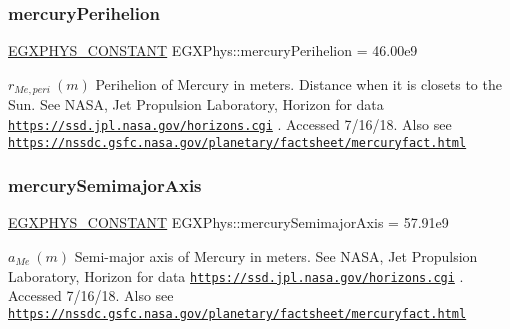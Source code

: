 \subsubsection{\texorpdfstring{mercury\+Perihelion}{mercuryPerihelion}}
{\footnotesize\ttfamily \mbox{\hyperlink{group___e_g_x_phys-_constants-_macros_ga76980d288494ce1714c9ac68a95ba702}{E\+G\+X\+P\+H\+Y\+S\+\_\+\+C\+O\+N\+S\+T\+A\+NT}} E\+G\+X\+Phys\+::mercury\+Perihelion = 46.\+00e9}

$ r_{Me,peri} \ (m)$ Perihelion of Mercury in meters. Distance when it is closets to the Sun. See N\+A\+SA, Jet Propulsion Laboratory, Horizon for data \href{https://ssd.jpl.nasa.gov/horizons.cgi}{\tt https\+://ssd.\+jpl.\+nasa.\+gov/horizons.\+cgi} . Accessed 7/16/18. Also see \href{https://nssdc.gsfc.nasa.gov/planetary/factsheet/mercuryfact.html}{\tt https\+://nssdc.\+gsfc.\+nasa.\+gov/planetary/factsheet/mercuryfact.\+html} \mbox{\label{group___e_g_x_phys-_constants-_astrophysics-_solar_system-_mercury-_orbit_ga595bacd615f9a5a0d92f53f6e7e01f04}} 
\subsubsection{\texorpdfstring{mercury\+Semimajor\+Axis}{mercurySemimajorAxis}}
{\footnotesize\ttfamily \mbox{\hyperlink{group___e_g_x_phys-_constants-_macros_ga76980d288494ce1714c9ac68a95ba702}{E\+G\+X\+P\+H\+Y\+S\+\_\+\+C\+O\+N\+S\+T\+A\+NT}} E\+G\+X\+Phys\+::mercury\+Semimajor\+Axis = 57.\+91e9}

$ a_{Me} \ (m)$ Semi-\/major axis of Mercury in meters. See N\+A\+SA, Jet Propulsion Laboratory, Horizon for data \href{https://ssd.jpl.nasa.gov/horizons.cgi}{\tt https\+://ssd.\+jpl.\+nasa.\+gov/horizons.\+cgi} . Accessed 7/16/18. Also see \href{https://nssdc.gsfc.nasa.gov/planetary/factsheet/mercuryfact.html}{\tt https\+://nssdc.\+gsfc.\+nasa.\+gov/planetary/factsheet/mercuryfact.\+html} \mbox{\label{group___e_g_x_phys-_constants-_astrophysics-_solar_system-_mercury-_orbit_gadd4d21698bc8b7f0780629e95cea5f52}} 
